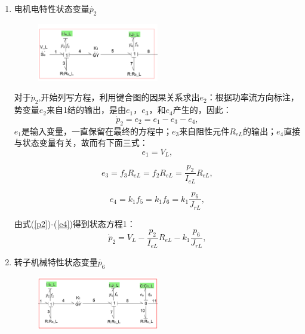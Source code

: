 \begin{enumerate}

\item {电机电特性状态变量$\dot{ p_2 }$}
\begin{figure}[h]
	\centering
	\includegraphics[width=0.5\textwidth]{fig/equation1.png}
	\caption{}\label{fig:equation1}
\end{figure}
对于$\dot{p} _ { 2 }$,开始列写方程，利用键合图的因果关系求出$e_2$：根据功率流方向标注，势变量$e_2$来自1结的输出，是由$e_1$，$e_3$，和$e_4$产生的，因此：
\begin{equation}\label{p2}
\dot{p} _ { 2 } = e _ { 2 } = e _ { 1 } - e _ { 3 } - e _ { 4 },
\end{equation}
$e_1$是输入变量，一直保留在最终的方程中；$e_3$来自阻性元件$R _ { eL }$的输出；$e_4$直接与状态变量有关，故而有下面三式：
\begin{equation}\label{e1}
e _ { 1} = V_L,
\end{equation}

\begin{equation}\label{e3}
e _ { 3 } = f _ { 3 } R _ { eL  }  = f _ { 2 } R _ { eL }  = \frac { p _ { 2 } } { I _ { eL } } R _ { eL},
\end{equation}

\begin{equation}\label{e4}
e _ { 4 } = k _ { 1 } f _ { 5 } = k _ { 1 } f _ { 6 } = k _ { 1 } \frac { p _ { 6 } } { J _ { r L}  },
\end{equation}

由式(\ref{p2})-(\ref{e4})得到状态方程1：
\begin{equation}
\dot { p } _ { 2 } = V _ {L}  - \frac { p _ { 2 } } { I _ { eL}  } R _ { eL} - k _ { 1 } \frac { p _ { 6 } } { J _ { rL} },
\end{equation}

\item {转子机械特性状态变量$\dot{ p_6 }$}
\begin{figure}[H]
	\centering
	\includegraphics[width=0.5\textwidth]{fig/equation2.png}
	\caption{}\label{fig:equation2}
\end{figure}


\end{enumerate}
